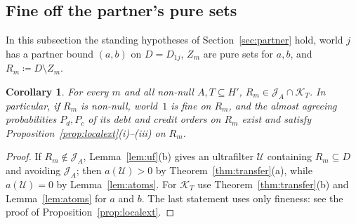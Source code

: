 \documentclass[11pt]{article}
\newtheorem{corollary}[theorem]{Corollary}
\theoremstyle{definition}\newtheorem{definition}[theorem]{Definition}
\theoremstyle{remark}\newtheorem{remark}[theorem]{Remark}
\newcommand{\Jid}{\mathcal J}
\newcommand{\Kid}{\mathcal K}
\newcommand{\Uf}{\mathcal U}
\begin{document}
\subsection{Fine off the partner's pure sets}

In this subsection the standing hypotheses of Section~\ref{sec:partner}
hold, world $j$ has a partner bound $(a,b)$ on $D=D_{1j}$, $Z_m$ are pure
sets for $a,b$, and $R_m\coloneqq D\setminus Z_m$.

\begin{corollary}\label{cor:fineoff}
For every $m$ and all non-null $A,T\subseteq H'$, $R_m\in\Jid_A\cap\Kid_T$.
In particular, if $R_m$ is non-null, world~$1$ is fine on $R_m$, and the
almost agreeing probabilities $P_d,P_c$ of its debt and credit orders on
$R_m$ exist and satisfy Proposition~\ref{prop:localext}(i)--(iii) on $R_m$.
\end{corollary}
\begin{proof}
If $R_m\notin\Jid_A$, Lemma~\ref{lem:uf}(b) gives an ultrafilter $\Uf$
containing $R_m\subseteq D$ and avoiding $\Jid_A$; then $a(\Uf)>0$ by
Theorem~\ref{thm:transfer}(a), while $a(\Uf)=0$ by Lemma~\ref{lem:atoms}.
For $\Kid_T$ use Theorem~\ref{thm:transfer}(b) and Lemma~\ref{lem:atoms} for
$a$ and $b$. The last statement uses only fineness: see the proof of
Proposition~\ref{prop:localext}.
\end{proof}
\end{document}
